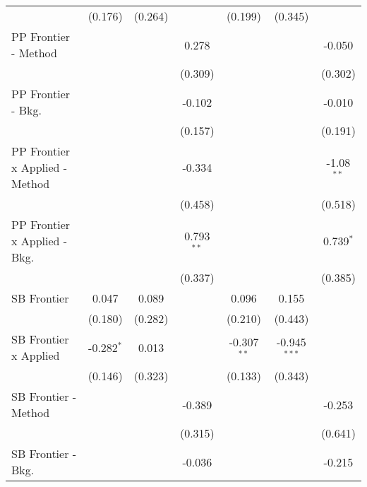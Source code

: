 \begin{tabular}{lcccccc}
                                  & (0.176)      & (0.264)       &               & (0.199)       & (0.345)        &   \\   
   PP Frontier - Method           &              &               & 0.278         &               &                & -0.050\\   
                                  &              &               & (0.309)       &               &                & (0.302)\\   
   PP Frontier - Bkg.             &              &               & -0.102        &               &                & -0.010\\   
                                  &              &               & (0.157)       &               &                & (0.191)\\   
   PP Frontier x Applied - Method &              &               & -0.334        &               &                & -1.08$^{**}$\\   
                                  &              &               & (0.458)       &               &                & (0.518)\\   
   PP Frontier x Applied - Bkg.   &              &               & 0.793$^{**}$  &               &                & 0.739$^{*}$\\   
                                  &              &               & (0.337)       &               &                & (0.385)\\   
   SB Frontier                    & 0.047        & 0.089         &               & 0.096         & 0.155          &   \\   
                                  & (0.180)      & (0.282)       &               & (0.210)       & (0.443)        &   \\   
   SB Frontier x Applied          & -0.282$^{*}$ & 0.013         &               & -0.307$^{**}$ & -0.945$^{***}$ &   \\   
                                  & (0.146)      & (0.323)       &               & (0.133)       & (0.343)        &   \\   
   SB Frontier - Method           &              &               & -0.389        &               &                & -0.253\\   
                                  &              &               & (0.315)       &               &                & (0.641)\\   
   SB Frontier - Bkg.             &              &               & -0.036        &               &                & -0.215\\   

\end{tabular}
